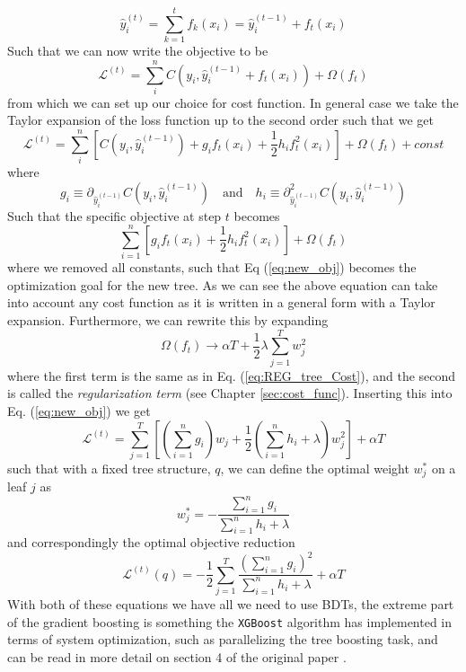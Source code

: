 \documentclass[12pt, a4paper]{book}
\begin{document}
\begin{equation}\label{eq:eff_ensemble}
    \hat{y}_i^{(t)}=\sum_{k=1}^{t}f_k(x_i) = \hat{y}_i^{(t-1)}+f_t(x_i)
\end{equation}
Such that we can now write the objective to be
\begin{equation}
    \mathcal{L}^{(t)}=\sum_{i}^{n}C(y_i,\hat{y}_i^{(t-1)}+f_t(x_i))+\Omega(f_t)
\end{equation}
from which we can set up our choice for cost function. In general case we take the Taylor expansion of the loss function up to the second order such that we get
$$
    \mathcal{L}^{(t)}=\sum_{i}^{n}\left[C(y_i,\hat{y}_i^{(t-1)})+g_i f_t(x_i)+\frac{1}{2}h_i f_t^2(x_i)\right]+\Omega(f_t)+const
$$
where 
$$
    g_i \equiv \partial_{\hat{y}_i^{(t-1)}}C(y_i,\hat{y}_i^{(t-1)}) \quad\text{and}\quad   h_i \equiv \partial^2_{\hat{y}_i^{(t-1)}}C(y_i,\hat{y}_i^{(t-1)})
$$
Such that the specific objective at step $t$ becomes
\begin{equation}\label{eq:new_obj}
    \sum_{i=1}^{n}\left[ g_i f_t(x_i) +\frac{1}{2}h_i f_t^2(x_i)\right] +\Omega(f_t)
\end{equation}
where we removed all constants, such that Eq (\ref{eq:new_obj}) becomes the optimization goal for the new tree. As we can see the above equation can take into account any cost function as it is written in a general form with a Taylor expansion. Furthermore, we can rewrite this by expanding 
$$
\Omega(f_t) \rightarrow \alpha T + \frac{1}{2}\lambda\sum_{j=1}^{T} w_j^2 
$$ 
where the first term is the same as in Eq. (\ref{eq:REG_tree_Cost}), and the second is called the \textit{regularization term} (see Chapter \ref{sec:cost_func}). Inserting this into Eq. (\ref{eq:new_obj}) we get
$$
\mathcal{L}^{(t)} = \sum_{j=1}^{T}\left[\left(\sum_{i=1}^{n} g_i\right)w_j +\frac{1}{2}\left(\sum_{i=1}^{n} h_i +\lambda \right)w_j^2\right] +\alpha T
$$
such that with a fixed tree structure, $q$, we can define the optimal weight $w_j^*$ on a leaf $j$ as 
\begin{equation}\label{eq:opt_wgt_bdt}
    w_j^*=-\frac{\sum_{i=1}^{n} g_i}{\sum_{i=1}^{n} h_i+\lambda}
\end{equation}
and correspondingly the optimal objective reduction
\begin{equation}\label{eq:opt_obj_bdt}
    \mathcal{L}^{(t)}(q)=-\frac{1}{2}\sum_{j=1}^{T}\frac{(\sum_{i=1}^{n} g_i)^2}{\sum_{i=1}^{n} h_i+\lambda}+\alpha T
\end{equation}
With both of these equations we have all we need to use BDTs, the extreme part of the gradient boosting is something the \verb|XGBoost| algorithm has implemented in terms of system optimization, such as parallelizing the tree boosting task, and can be read in more detail on section 4 of the original paper \cite{XGBoost}.
\end{document}
